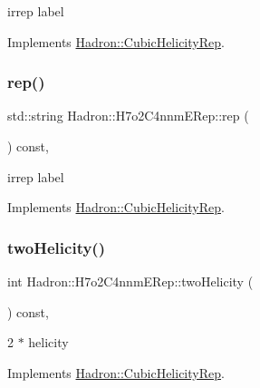 irrep label 

Implements \mbox{\hyperlink{structHadron_1_1CubicHelicityRep_a8cdd86f068a167dc96faef02bfb8a33d}{Hadron\+::\+Cubic\+Helicity\+Rep}}.

\mbox{\label{structHadron_1_1H7o2C4nnmERep_a42e882ae78a0d7fd00653fa44e65f81f}} 
\subsubsection{\texorpdfstring{rep()}{rep()}\hspace{0.1cm}{\footnotesize\ttfamily [3/3]}}
{\footnotesize\ttfamily std\+::string Hadron\+::\+H7o2\+C4nnm\+E\+Rep\+::rep (\begin{DoxyParamCaption}{ }\end{DoxyParamCaption}) const\hspace{0.3cm}{\ttfamily [inline]}, {\ttfamily [virtual]}}

irrep label 

Implements \mbox{\hyperlink{structHadron_1_1CubicHelicityRep_a8cdd86f068a167dc96faef02bfb8a33d}{Hadron\+::\+Cubic\+Helicity\+Rep}}.

\mbox{\label{structHadron_1_1H7o2C4nnmERep_a31bbba3df84a0943bb90635b1c99e5f0}} 
\subsubsection{\texorpdfstring{twoHelicity()}{twoHelicity()}\hspace{0.1cm}{\footnotesize\ttfamily [1/3]}}
{\footnotesize\ttfamily int Hadron\+::\+H7o2\+C4nnm\+E\+Rep\+::two\+Helicity (\begin{DoxyParamCaption}{ }\end{DoxyParamCaption}) const\hspace{0.3cm}{\ttfamily [inline]}, {\ttfamily [virtual]}}

2 $\ast$ helicity 

Implements \mbox{\hyperlink{structHadron_1_1CubicHelicityRep_af507aa56fc2747eacc8cb6c96db31ecc}{Hadron\+::\+Cubic\+Helicity\+Rep}}.

\mbox{\label{structHadron_1_1H7o2C4nnmERep_a31bbba3df84a0943bb90635b1c99e5f0}} 
